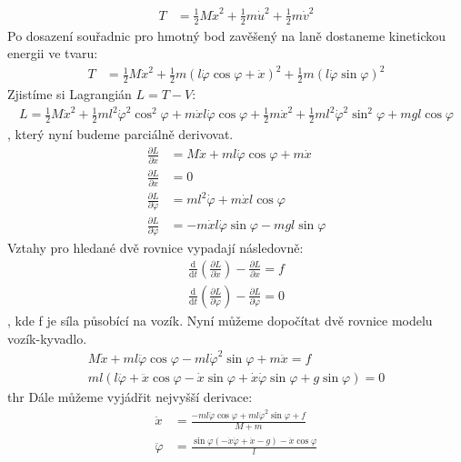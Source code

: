 \documentclass[a4paper, 12pt]{article}
\begin{document}
			\begin{align*}
				T &= \frac{1}{2}M\dot{x}^2+\frac{1}{2}m\dot{u}^2+\frac{1}{2}m\dot{v}^2
			\end{align*}
			Po dosazení souřadnic pro hmotný bod zavěšený na laně dostaneme kinetickou energii ve tvaru:
			\begin{align*}
				T &= \frac{1}{2}M\dot{x}^2+\frac{1}{2}m(l\dot{\varphi}\cos\varphi+\dot{x})^2+\frac{1}{2}m(l\dot{\varphi}\sin\varphi)^2
			\end{align*}
			Zjistíme si Lagrangián $L = T - V$:
			\begin{align*}
				L = \frac{1}{2}M\dot{x}^2+\frac{1}{2}ml^2\dot{\varphi}^2\cos^2\varphi+m\dot{x}l\dot{\varphi}\cos\varphi+\frac{1}{2}m\dot{x}^2+\frac{1}{2}ml^2\dot{\varphi}^2\sin^2\varphi+mgl\cos\varphi
			\end{align*}
			, který nyní budeme parciálně derivovat.
			\begin{align*}
				\frac{\partial L}{\partial\dot{x}} &= M\dot{x}+ml\dot{\varphi}\cos\varphi+m\dot{x}\\
				\frac{\partial L}{\partial x} &= 0\\
				\frac{\partial L}{\partial \dot{\varphi}} &= ml^2\dot{\varphi}+m\dot{x}l\cos\varphi\\
				\frac{\partial L}{\partial \varphi} &= -m\dot{x}l\dot{\varphi}\sin\varphi-mgl\sin\varphi
			\end{align*}
			Vztahy pro hledané dvě rovnice vypadají následovně:
			\begin{align*}
				\frac{\mathrm{d}}{\mathrm{d}t}\left(\frac{\partial L}{\partial \dot{x}}\right) - \frac{\partial L}{\partial x} = f\\
				\frac{\mathrm{d}}{\mathrm{d}t}\left(\frac{\partial L}{\partial \dot{\varphi}}\right) - \frac{\partial L}{\partial \varphi} = 0
			\end{align*}
			, kde f je síla působící na vozík. Nyní můžeme dopočítat dvě rovnice modelu vozík-kyvadlo.
			\begin{align*}
				M\dot{x}+ml\ddot{\varphi}\cos\varphi-ml\dot{\varphi}^2\sin\varphi+m\ddot{x} = f\\
				ml\left(l\ddot{\varphi}+\ddot{x}\cos\varphi-\dot{x}\sin\varphi+\dot{x}\dot{\varphi}\sin\varphi+g\sin\varphi\right)=0
			\end{align*}
thr			Dále můžeme vyjádřit nejvyšší derivace:
			\begin{align*}
				\ddot{x} &= \frac{-ml\ddot{\varphi}\cos\varphi+ml\dot{\varphi}^2\sin\varphi+f}{M+m}\\
				\ddot{\varphi} &= \frac{\sin\varphi\left(-\dot{x}\dot{\varphi}+\dot{x}-g\right)-\ddot{x}\cos\varphi}{l}
			\end{align*}
\end{document}
